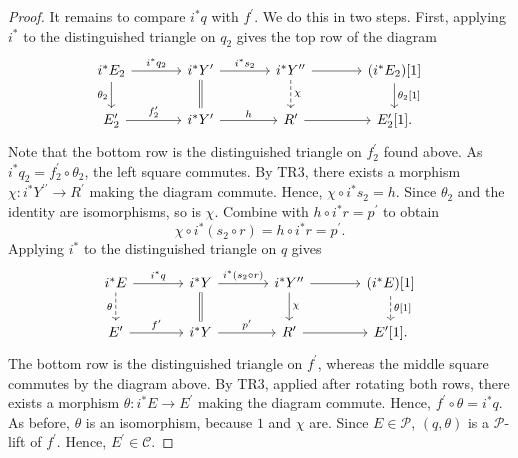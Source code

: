 \documentclass[11pt]{amsart}
\theoremstyle{plain}
\theoremstyle{definition}
\numberwithin{equation}{section}
\numberwithin{theorem}{section}
\begin{document}
\begin{proof}
    It remains to compare $i^\ast q$ with $f^\prime$.
    We do this in two steps.
    First, applying $i^\ast$ to the distinguished triangle on $q_2$ gives the top row of the diagram
    \begin{displaymath}
        \begin{tikzcd}[column sep=large]
            i^\ast E_2 \ar[r, "i^\ast q_2"] \ar[d, "\theta_2"'] & i^\ast Y^\prime \ar[r, "i^\ast s_2"] \ar[d, equal] & i^\ast Y^{\prime\prime} \ar[r] \ar[d, dashed, "\chi"] & (i^\ast E_2)[1] \ar[d, "{\theta_2[1]}"] \\
            E^\prime_2 \ar[r, "f^\prime_2"] & i^\ast Y^\prime \ar[r, "h"] & R^\prime \ar[r] & E^\prime_2[1].
        \end{tikzcd}
    \end{displaymath}
    Note that the bottom row is the distinguished triangle on $f^\prime_2$ found above.
    As $i^\ast q_2 = f^\prime_2\circ \theta_2$, the left square commutes.
    By TR3, there exists a morphism $\chi\colon i^\ast Y^{\prime\prime}\to R^\prime$ making the diagram commute.
    Hence, $\chi\circ i^\ast s_2 = h$.
    Since $\theta_2$ and the identity are isomorphisms, so is  $\chi$.
    Combine with $h\circ i^\ast r = p^\prime$ to obtain
    \begin{displaymath}
        \chi\circ i^\ast(s_2\circ r) = h\circ i^\ast r = p^\prime.
    \end{displaymath}
    Applying $i^\ast$ to the distinguished triangle on $q$ gives 
    \begin{displaymath}
        \begin{tikzcd}[column sep=large]
            i^\ast E \ar[r, "i^\ast q"] \ar[d, dashed, "\theta"'] & i^\ast Y \ar[r, "i^\ast(s_2\circ r)"] \ar[d, equal] & i^\ast Y^{\prime\prime} \ar[r] \ar[d, "\chi"] & (i^\ast E)[1] \ar[d, dashed, "{\theta[1]}"] \\
            E^\prime \ar[r, "f^\prime"] & i^\ast Y \ar[r, "p^\prime"] & R^\prime \ar[r] & E^\prime[1].
        \end{tikzcd}
    \end{displaymath}
    The bottom row is the distinguished triangle on $f^\prime$, whereas the middle square commutes by the diagram above.
    By TR3, applied after rotating both rows, there exists a morphism $\theta\colon i^\ast E\to E^\prime$ making the diagram commute.
    Hence, $f^\prime\circ \theta = i^\ast q$.
    As before, $\theta$ is an isomorphism, because $1$ and $\chi$ are.
    Since $E\in \mathcal{P}$, $(q,\theta)$ is a $\mathcal{P}$-lift of $f^\prime$.
    Hence, $E^\prime\in \mathcal{C}$.


\end{proof}
\end{document}
